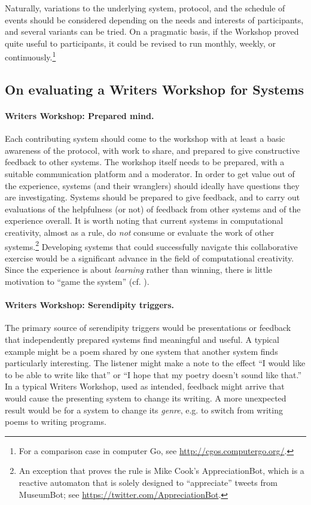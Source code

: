 Naturally, variations to the underlying system, protocol, and the
schedule of events should be considered depending on the needs and
interests of participants, and several variants can be tried.  On a
pragmatic basis, if the Workshop proved quite useful to participants,
it could be revised to run monthly, weekly, or
continuously.\footnote{For a comparison case in computer Go, see
  \url{http://cgos.computergo.org/}.}



\subsection{On evaluating a Writers Workshop for Systems}

\paragraph{Writers Workshop: Prepared mind.}
Each contributing system should come to the workshop with at least a
basic awareness of the protocol, with work to share, and prepared to
give constructive feedback to other systems.  The workshop itself
needs to be prepared, with a suitable communication platform and a
moderator.  In order to get value out of the experience, systems (and
their wranglers) should ideally have questions they are investigating.
Systems should be prepared to give feedback, and to carry out
evaluations of the helpfulness (or not) of feedback from other systems
and of the experience overall.  It is worth noting that current
systems in computational creativity, almost as a rule, do \emph{not}
consume or evaluate the work of other systems.\footnote{An exception
  that proves the rule is Mike Cook's {\sf AppreciationBot}, which is
   a reactive automaton that is solely designed to ``appreciate''
   tweets from {\sf MuseumBot}; see
  \url{https://twitter.com/AppreciationBot}.}  Developing systems that
could successfully navigate this collaborative exercise would be a
significant advance in the field of computational creativity.  Since
the experience is about \emph{learning} rather than winning, there is
little motivation to ``game the system''
(cf. \cite{lenat1983eurisko}).

\paragraph{Writers Workshop: Serendipity triggers.}

The primary source of serendipity triggers would be presentations or
feedback that independently prepared systems find meaningful and
useful.  A typical example might be a poem shared by one system that
another system finds particularly interesting.  The listener might
make a note to the effect ``I would like to be able to write like
that'' or ``I hope that my poetry doesn't sound like that.''  In a
typical Writers Workshop, used as intended, feedback might arrive that
would cause the presenting system to change its writing.  A more
unexpected result would be for a system to change its \emph{genre},
e.g. to switch from writing poems to writing programs.

